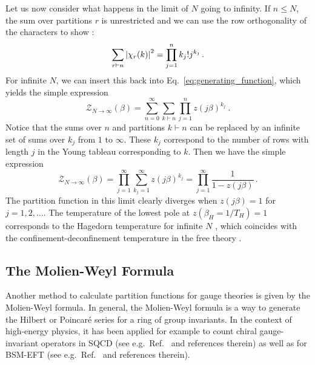 \documentclass[a4paper,11pt]{article}
\begin{document}
Let us now consider what happens in the limit of $N$ going to infinity. If $n\leq N$, the sum over partitions $r$ is unrestricted and we can use the row orthogonality of the characters to show \cite{Zee:2016fuk}:
% 
\begin{equation}
	\sum_{r\vdash n} \abs{\chi_r(k)}^2 = \prod_{j=1}^n k_j! j^{k_j} \,.
\end{equation}
% 
For infinite $N$, we can insert this back into Eq.\ \eqref{eq:generating_function}, which yields the simple expression \cite{Sundborg:1999ue}
% 
\begin{equation} \label{eq:partition_planar}
	\mathcal{Z}_{N\rightarrow\infty}(\beta) = \sum_{n=0}^\infty \sum_{k\vdash n}  \prod_{j=1}^n z(j\beta)^{k_j} \ .
\end{equation}
% 
Notice that the sums over $n$ and partitions $k\vdash n$ can be replaced by an infinite set of sums over $k_j$ from $1$ to $\infty$. These $k_j$ correspond to the number of rows with length $j$ in the Young tableau corresponding to $k$. Then we have the simple expression
% 
\begin{equation}\label{partition_inf_N}
	\mathcal{Z}_{N\rightarrow\infty}(\beta) = \prod_{j=1}^\infty \sum_{k_j=1}^\infty z(j\beta)^{k_j} = \prod_{j=1}^\infty \frac{1}{1-z(j\beta)} \, .
\end{equation}
% 
The partition function in this limit clearly diverges when $z(j\beta)=1$ for $j=1,2,\dotsc$. The temperature of the lowest pole at $z(\beta_H=1/T_H)=1$ corresponds to the Hagedorn temperature for infinite $N$ \cite{Sundborg:1999ue}, which coincides with the  confinement-deconfinement temperature in the free theory \cite{Aharony:2003sx}. 


\subsection{The Molien-Weyl Formula}

Another method to calculate partition functions for gauge theories is given by the Molien-Weyl formula.
In general, the Molien-Weyl formula is a way to generate the Hilbert or Poincar\'e series for a ring of group invariants.
In the context of high-energy physics, it has been applied for example to count chiral gauge-invariant operators in SQCD (see e.g.\ Ref.\ \cite{Gray:2008yu} and references therein) as well as for BSM-EFT (see e.g.\ Ref.\ \cite{Banerjee:2020bym} and references therein).
\end{document}
